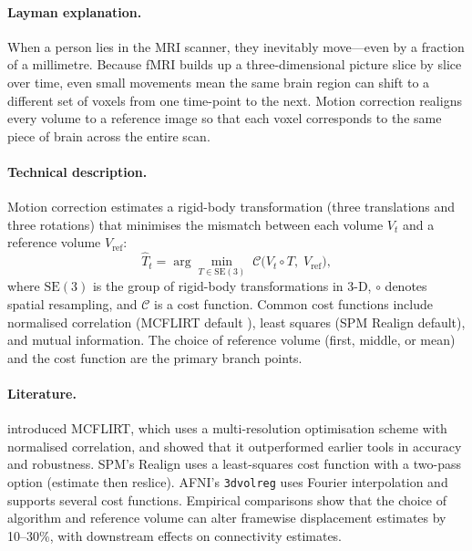 \documentclass[11pt,a4paper]{article}
\begin{document}
\paragraph{Layman explanation.}
When a person lies in the MRI scanner, they inevitably move---even by a fraction of a millimetre.  Because fMRI builds up a three-dimensional picture slice by slice over time, even small movements mean the same brain region can shift to a different set of voxels from one time-point to the next.  Motion correction realigns every volume to a reference image so that each voxel corresponds to the same piece of brain across the entire scan.

\paragraph{Technical description.}
Motion correction estimates a rigid-body transformation (three translations and three rotations) that minimises the mismatch between each volume $V_t$ and a reference volume $V_{\mathrm{ref}}$:
\begin{equation}
    \hat{T}_t = \arg\min_{T \in \mathrm{SE}(3)} \; \mathcal{C}\!\bigl(V_t \circ T,\; V_{\mathrm{ref}}\bigr),
\end{equation}
where $\mathrm{SE}(3)$ is the group of rigid-body transformations in 3-D, $\circ$ denotes spatial resampling, and $\mathcal{C}$ is a cost function.  Common cost functions include normalised correlation (MCFLIRT default \citep{jenkinson2002}), least squares (SPM Realign default), and mutual information.  The choice of reference volume (first, middle, or mean) and the cost function are the primary branch points.

\paragraph{Literature.}
\citet{jenkinson2002} introduced MCFLIRT, which uses a multi-resolution optimisation scheme with normalised correlation, and showed that it outperformed earlier tools in accuracy and robustness.  SPM's Realign uses a least-squares cost function with a two-pass option (estimate then reslice).  AFNI's \texttt{3dvolreg} uses Fourier interpolation and supports several cost functions.  Empirical comparisons \citep{oakes2005} show that the choice of algorithm and reference volume can alter framewise displacement estimates by 10--30\%, with downstream effects on connectivity estimates.
\end{document}
